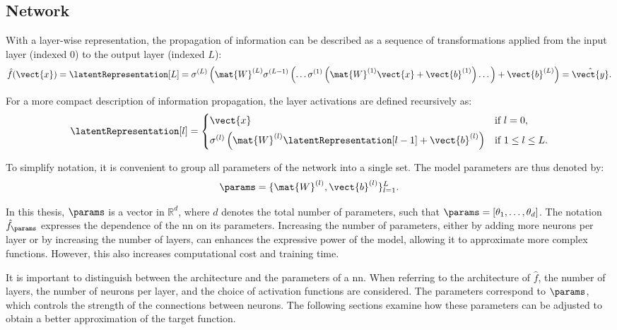 \subsection{Network}

With a layer-wise representation, the propagation of information can be described as a sequence of transformations applied from the input layer (indexed $0$) to the output layer (indexed $L$):
\begin{equation}
\hat{f}(\vect{x}) = \latentRepresentation[L] = \sigma^{(L)}\left(\mat{W}^{(L)} \sigma^{(L-1)}\left(\dots \sigma^{(1)}\left(\mat{W}^{(1)} \vect{x} + \vect{b}^{(1)}\right) \dots \right) + \vect{b}^{(L)}\right) = \hat{\vect{y}}.
\label{eq:network_full}
\end{equation}

For a more compact description of information propagation, the layer activations are defined recursively as:
\begin{equation}
\latentRepresentation[l] =
\begin{cases}
\vect{x} & \text{if } l = 0,\\[4pt]
\sigma^{(l)}\left(\mat{W}^{(l)} \latentRepresentation[l-1] + \vect{b}^{(l)}\right) & \text{if } 1 \le l \le L.
\end{cases}
\label{eq:layer_recursive}
\end{equation}

To simplify notation, it is convenient to group all parameters of the network into a single set.
The model parameters are thus denoted by:
\begin{equation}
\params = \{\mat{W}^{(l)}, \vect{b}^{(l)}\}_{l=1}^{L}.
\label{eq:parameters}
\end{equation}

In this thesis, $\params$ is a vector in $\mathbb{R}^d$, where $d$ denotes the total number of parameters, such that $\params = [\theta_1, \dots, \theta_d]$.
The notation $\hat{f}_{\params}$ expresses the dependence of the \gls{nn} on its parameters.
Increasing the number of parameters, either by adding more neurons per layer or by increasing the number of layers, can enhances the expressive power of the model, allowing it to approximate more complex functions.
However, this also increases computational cost and training time.

It is important to distinguish between the architecture and the parameters of a \gls{nn}.
When referring to the architecture of $\hat{f}$, the number of layers, the number of neurons per layer, and the choice of activation functions are considered.
The parameters correspond to $\params$, which controls the strength of the connections between neurons.
The following sections examine how these parameters can be adjusted to obtain a better approximation of the target function.